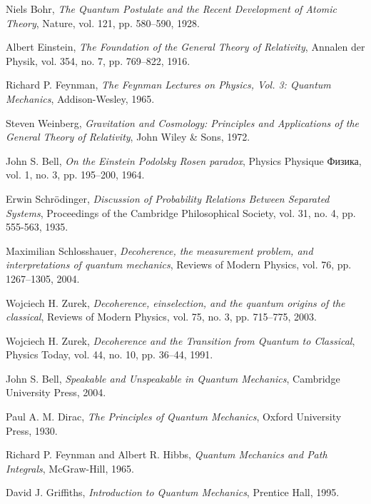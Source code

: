 \documentclass[12pt]{article}
\begin{document}
\begin{thebibliography}{999}

Niels Bohr,
\textit{The Quantum Postulate and the Recent Development of Atomic Theory},
Nature, vol. 121, pp. 580--590, 1928.

Albert Einstein,
\textit{The Foundation of the General Theory of Relativity},
Annalen der Physik, vol. 354, no. 7, pp. 769–822, 1916.

Richard P. Feynman,
\textit{The Feynman Lectures on Physics, Vol. 3: Quantum Mechanics},
Addison-Wesley, 1965.

Steven Weinberg,
\textit{Gravitation and Cosmology: Principles and Applications of the General Theory of Relativity},
John Wiley \& Sons, 1972.

John S. Bell,
\textit{On the Einstein Podolsky Rosen paradox},
Physics Physique Физика, vol. 1, no. 3, pp. 195–200, 1964.

Erwin Schrödinger,
\textit{Discussion of Probability Relations Between Separated Systems},
Proceedings of the Cambridge Philosophical Society, vol. 31, no. 4, pp. 555-563, 1935.

Maximilian Schlosshauer,
\textit{Decoherence, the measurement problem, and interpretations of quantum mechanics},
Reviews of Modern Physics, vol. 76, pp. 1267–1305, 2004.

Wojciech H. Zurek,
\textit{Decoherence, einselection, and the quantum origins of the classical},
Reviews of Modern Physics, vol. 75, no. 3, pp. 715–775, 2003.

Wojciech H. Zurek,
\textit{Decoherence and the Transition from Quantum to Classical},
Physics Today, vol. 44, no. 10, pp. 36–44, 1991.

John S. Bell,
\textit{Speakable and Unspeakable in Quantum Mechanics},
Cambridge University Press, 2004.

Paul A. M. Dirac,
\textit{The Principles of Quantum Mechanics},
Oxford University Press, 1930.

Richard P. Feynman and Albert R. Hibbs,
\textit{Quantum Mechanics and Path Integrals},
McGraw-Hill, 1965.

David J. Griffiths,
\textit{Introduction to Quantum Mechanics},
Prentice Hall, 1995.


\end{thebibliography}
\end{document}
